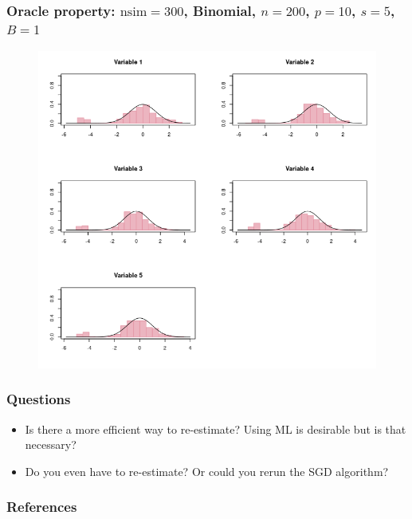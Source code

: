 \documentclass{beamer}
\begin{document}
\begin{frame}
  \frametitle{Oracle property: $\text{nsim}=300$, Binomial, $n=200$, $p=10$, $s=5$, $B=1$}
  \begin{figure}[h!]
    \centering
    \includegraphics[scale=0.3]{oracle_sgd1.png}
  \end{figure}
\end{frame}

\begin{frame}
  \frametitle{Questions}
  \begin{itemize}
  \item Is there a more efficient way to re-estimate? Using ML is desirable but is that necessary? 
  \item Do you even have to re-estimate? Or could you rerun the SGD algorithm?
  \end{itemize}
\end{frame}

\begin{frame}
  \frametitle{References}
  
  
\end{frame}
\end{document}
